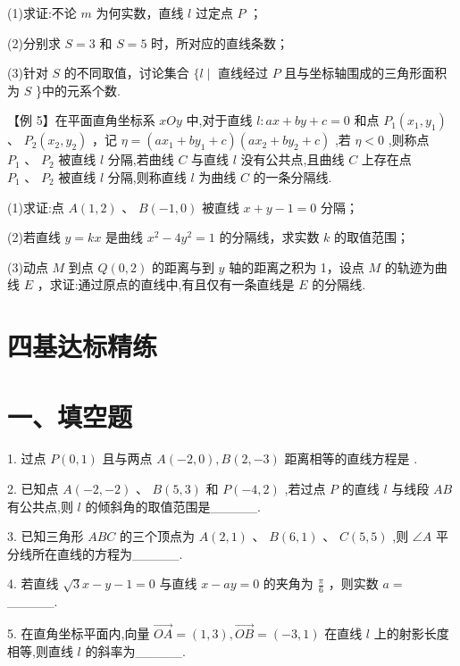 (1)求证:不论 $m$ 为何实数，直线 $l$ 过定点 $P$ ；

(2)分别求 $S = 3$ 和 $S = 5$ 时，所对应的直线条数；

(3)针对 $S$ 的不同取值，讨论集合 $\{ l \mid$ 直线经过 $P$ 且与坐标轴围成的三角形面积为 $S$ \}中的元系个数.

【例 5】在平面直角坐标系 ${xOy}$ 中,对于直线 $l : {ax} + {by} + c = 0$ 和点 ${P}_{1}\left( {{x}_{1},{y}_{1}}\right)$ 、 ${P}_{2}\left( {{x}_{2},{y}_{2}}\right)$ ，记 $\eta  =  \left( {a{x}_{1} + b{y}_{1} + c}\right) \left( {a{x}_{2} + b{y}_{2} + c}\right)$ ,若 $\eta  < 0$ ,则称点 ${P}_{1}\text{ 、 }{P}_{2}$ 被直线 $l$ 分隔,若曲线 $C$ 与直线 $l$ 没有公共点,且曲线 $C$ 上存在点 ${P}_{1}\text{ 、 }{P}_{2}$ 被直线 $l$ 分隔,则称直线 $l$ 为曲线 $C$ 的一条分隔线.

(1)求证:点 $A\left( {1,2}\right)$ 、 $B\left( {-1,0}\right)$ 被直线 $x + y - 1 = 0$ 分隔；

(2)若直线 $y = {kx}$ 是曲线 ${x}^{2} - 4{y}^{2} = 1$ 的分隔线，求实数 $k$ 的取值范围；

(3)动点 $M$ 到点 $Q\left( {0,2}\right)$ 的距离与到 $y$ 轴的距离之积为 1，设点 $M$ 的轨迹为曲线 $E$ ，求证:通过原点的直线中,有且仅有一条直线是 $E$ 的分隔线.

\section*{四基达标精练}

\section*{一、填空题}

1. 过点 $P\left( {0,1}\right)$ 且与两点 $A\left( {-2,0}\right) ,B\left( {2, - 3}\right)$ 距离相等的直线方程是 .

2. 已知点 $A\left( {-2, - 2}\right) \text{ 、 }B\left( {5,3}\right)$ 和 $P\left( {-4,2}\right)$ ,若过点 $P$ 的直线 $l$ 与线段 ${AB}$ 有公共点,则 $l$ 的倾斜角的取值范围是\_\_\_\_\_.

3. 已知三角形 ${ABC}$ 的三个顶点为 $A\left( {2,1}\right) \text{ 、 }B\left( {6,1}\right) \text{ 、 }C\left( {5,5}\right)$ ,则 $\angle A$ 平分线所在直线的方程为\_\_\_\_\_.

4. 若直线 $\sqrt{3}x - y - 1 = 0$ 与直线 $x - {ay} = 0$ 的夹角为 $\frac{\pi }{6}$ ，则实数 $a =$ \_\_\_\_\_.

5. 在直角坐标平面内,向量 $\overrightarrow{OA} = \left( {1,3}\right) ,\overrightarrow{OB} = \left( {-3,1}\right)$ 在直线 $l$ 上的射影长度相等,则直线 $l$ 的斜率为\_\_\_\_\_.

